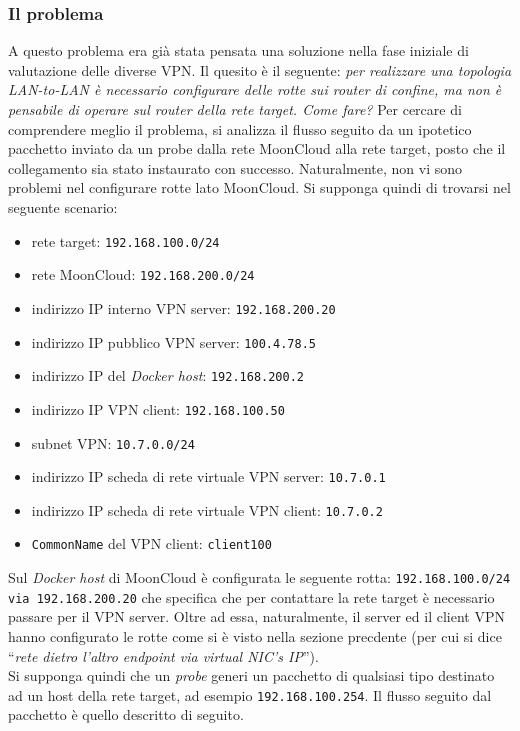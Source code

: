 \subsubsection{Il problema}
A questo problema era già stata pensata una soluzione nella fase iniziale di valutazione
delle diverse VPN. Il quesito è il seguente: \textit{per realizzare una topologia
LAN-to-LAN è necessario configurare delle rotte sui router di confine, ma non è
pensabile di operare sul router della rete target. Come fare?}
Per cercare di comprendere meglio il problema, si analizza il flusso seguito
da un ipotetico pacchetto inviato da un probe dalla rete MoonCloud alla rete target,
posto che il collegamento sia stato instaurato con successo. Naturalmente, non vi sono
problemi nel configurare rotte lato MoonCloud. Si supponga quindi di trovarsi nel
seguente scenario:
\begin{itemize}
  \item rete target: \texttt{192.168.100.0/24}
  \item rete MoonCloud: \texttt{192.168.200.0/24}
  \item indirizzo IP interno VPN server: \texttt{192.168.200.20}
  \item indirizzo IP pubblico VPN server: \texttt{100.4.78.5}
  \item indirizzo IP del \textit{Docker host}: \texttt{192.168.200.2}
  \item indirizzo IP VPN client: \texttt{192.168.100.50}
  \item subnet VPN: \texttt{10.7.0.0/24}
  \item indirizzo IP scheda di rete virtuale VPN server: \texttt{10.7.0.1}
  \item indirizzo IP scheda di rete virtuale VPN client: \texttt{10.7.0.2}
  \item \texttt{CommonName} del VPN client: \texttt{client100}
\end{itemize}
Sul \textit{Docker host} di MoonCloud è configurata le seguente rotta:
\texttt{192.168.100.0/24 via 192.168.200.20} che specifica che per contattare la rete target
è necessario passare per il VPN server. Oltre ad essa, naturalmente, il server ed il
client VPN hanno configurato le rotte come si è visto nella sezione precdente
(per cui si dice ``\textit{rete dietro l'altro endpoint via virtual NIC's IP}'').\\
Si supponga quindi che un \textit{probe}  generi un pacchetto di qualsiasi tipo destinato
ad un host della rete target, ad esempio \texttt{192.168.100.254}.
Il flusso seguito dal pacchetto è quello descritto di seguito.
